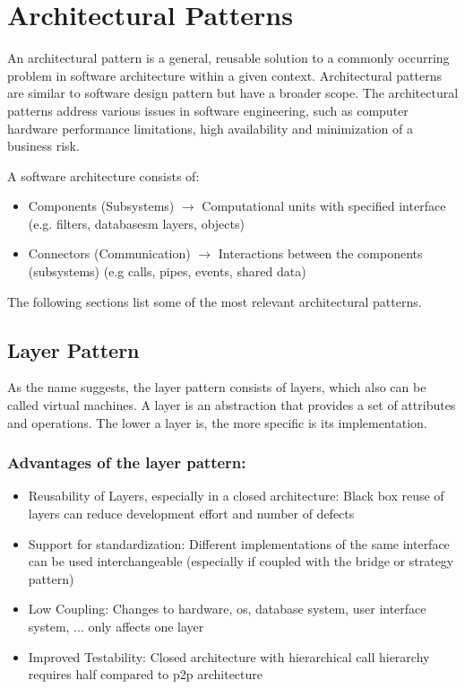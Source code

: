 
\section{Architectural Patterns}
An architectural pattern is a general, reusable solution to a commonly occurring problem in software architecture within a given context.
Architectural patterns are similar to software design pattern but have a broader scope.
The architectural patterns address various issues in software engineering, such as computer hardware performance limitations, high availability and minimization of a business risk.

A software architecture consists of:
\begin{itemize}
	\item Components (Subsystems)
	\subitem $\rightarrow$ Computational units with specified interface (e.g. filters, databasesm layers, objects)
	\item Connectors (Communication)
	\subitem $\rightarrow$ Interactions between the components (subsystems) (e.g calls, pipes, events, shared data)
\end{itemize}

The following sections list some of the most relevant architectural patterns.
\newpage

\subsection{Layer Pattern}
As the name suggests, the layer pattern consists of layers, which also can be called virtual machines.
A layer is an abstraction that provides a set of attributes and operations.
The lower a layer is, the more specific is its implementation.\newline

\subsubsection*{Advantages of the layer pattern:}
\begin{itemize}
	\item Reusability of Layers, especially in a closed architecture:
		\subitem Black box reuse of layers can reduce development effort and number of defects
	\item Support for standardization:
		\subitem Different implementations of the same interface can be used interchangeable
		\subitem (especially if coupled with the bridge or strategy pattern)
	\item Low Coupling:
		\subitem Changes to hardware, os, database system, user interface
		system, ... only affects one layer
	\item Improved Testability:
		\subitem Closed architecture with hierarchical call hierarchy requires half
		compared to p2p architecture
\end{itemize}

